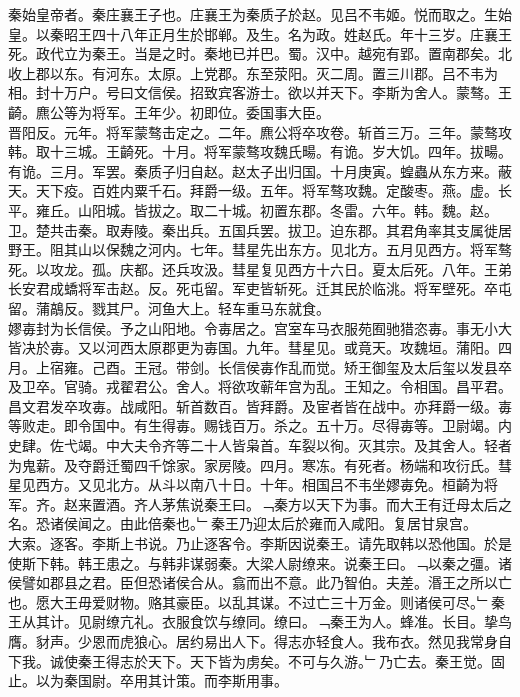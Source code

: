 \documentclass{zhvt-classic}
\begin{document}





\hspace*{2em}秦始皇帝者。秦庄襄王子也。庄襄王为秦质子於赵。见吕不韦姬。悦而取之。生始皇。以秦昭王四十八年正月生於邯郸。及生。名为政。姓赵氏。年十三岁。庄襄王死。政代立为秦王。当是之时。秦地已并巴。蜀。汉中。越宛有郢。置南郡矣。北收上郡以东。有河东。太原。上党郡。东至荥阳。灭二周。置三川郡。吕不韦为相。封十万户。号曰文信侯。招致宾客游士。欲以并天下。李斯为舍人。蒙骜。王齮。麃公等为将军。王年少。初即位。委国事大臣。\\
\hspace*{2em}晋阳反。元年。将军蒙骜击定之。二年。麃公将卒攻卷。斩首三万。三年。蒙骜攻韩。取十三城。王齮死。十月。将军蒙骜攻魏氏畼。有诡。岁大饥。四年。拔畼。有诡。三月。军罢。秦质子归自赵。赵太子出归国。十月庚寅。蝗蟲从东方来。蔽天。天下疫。百姓内粟千石。拜爵一级。五年。将军骜攻魏。定酸枣。燕。虚。长平。雍丘。山阳城。皆拔之。取二十城。初置东郡。冬雷。六年。韩。魏。赵。卫。楚共击秦。取寿陵。秦出兵。五国兵罢。拔卫。迫东郡。其君角率其支属徙居野王。阻其山以保魏之河内。七年。彗星先出东方。见北方。五月见西方。将军骜死。以攻龙。孤。庆都。还兵攻汲。彗星复见西方十六日。夏太后死。八年。王弟长安君成蟜将军击赵。反。死屯留。军吏皆斩死。迁其民於临洮。将军壁死。卒屯留。蒲鶮反。戮其尸。河鱼大上。轻车重马东就食。\\
\hspace*{2em}嫪毐封为长信侯。予之山阳地。令毐居之。宫室车马衣服苑囿驰猎恣毐。事无小大皆决於毐。又以河西太原郡更为毐国。九年。彗星见。或竟天。攻魏垣。蒲阳。四月。上宿雍。己酉。王冠。带剑。长信侯毐作乱而觉。矫王御玺及太后玺以发县卒及卫卒。官骑。戎翟君公。舍人。将欲攻蕲年宫为乱。王知之。令相国。昌平君。昌文君发卒攻毐。战咸阳。斩首数百。皆拜爵。及宦者皆在战中。亦拜爵一级。毐等败走。即令国中。有生得毐。赐钱百万。杀之。五十万。尽得毐等。卫尉竭。内史肆。佐弋竭。中大夫令齐等二十人皆枭首。车裂以徇。灭其宗。及其舍人。轻者为鬼薪。及夺爵迁蜀四千馀家。家房陵。四月。寒冻。有死者。杨端和攻衍氏。彗星见西方。又见北方。从斗以南八十日。十年。相国吕不韦坐嫪毐免。桓齮为将军。齐。赵来置酒。齐人茅焦说秦王曰。﹁秦方以天下为事。而大王有迁母太后之名。恐诸侯闻之。由此倍秦也。﹂秦王乃迎太后於雍而入咸阳。复居甘泉宫。\\
\hspace*{2em}大索。逐客。李斯上书说。乃止逐客令。李斯因说秦王。请先取韩以恐他国。於是使斯下韩。韩王患之。与韩非谋弱秦。大梁人尉缭来。说秦王曰。﹁以秦之彊。诸侯譬如郡县之君。臣但恐诸侯合从。翕而出不意。此乃智伯。夫差。湣王之所以亡也。愿大王毋爱财物。赂其豪臣。以乱其谋。不过亡三十万金。则诸侯可尽。﹂秦王从其计。见尉缭亢礼。衣服食饮与缭同。缭曰。﹁秦王为人。蜂准。长目。挚鸟膺。豺声。少恩而虎狼心。居约易出人下。得志亦轻食人。我布衣。然见我常身自下我。诚使秦王得志於天下。天下皆为虏矣。不可与久游。﹂乃亡去。秦王觉。固止。以为秦国尉。卒用其计策。而李斯用事。\\
\end{document}
